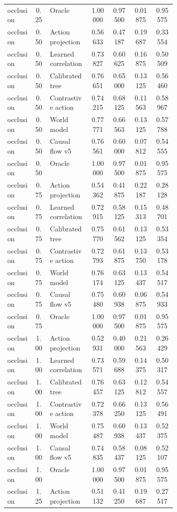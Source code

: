 \documentclass{article}
\begin{document}
\begin{center}
\begin{longtable}{p{0.16\linewidth}cp{0.24\linewidth}cccc}
occlusion & 0.25 & Oracle & 1.00000 & 0.97500 & 0.01875 & 0.95575\\
occlusion & 0.50 & Action projection & 0.56633 & 0.47187 & 0.19687 & 0.33554\\
occlusion & 0.50 & Learned correlation & 0.73827 & 0.60625 & 0.16875 & 0.50509\\
occlusion & 0.50 & Calibrated tree & 0.76651 & 0.65000 & 0.13125 & 0.56460\\
occlusion & 0.50 & Contrastive action & 0.74215 & 0.68125 & 0.11563 & 0.58967\\
occlusion & 0.50 & World model & 0.77771 & 0.66563 & 0.13125 & 0.57788\\
occlusion & 0.50 & Causal flow v5 & 0.76561 & 0.60000 & 0.07812 & 0.54555\\
occlusion & 0.50 & Oracle & 1.00000 & 0.97500 & 0.01875 & 0.95575\\
occlusion & 0.75 & Action projection & 0.54362 & 0.41875 & 0.22187 & 0.28128\\
occlusion & 0.75 & Learned correlation & 0.72915 & 0.58125 & 0.15313 & 0.48701\\
occlusion & 0.75 & Calibrated tree & 0.75770 & 0.61562 & 0.13125 & 0.53354\\
occlusion & 0.75 & Contrastive action & 0.72793 & 0.61875 & 0.13750 & 0.53178\\
occlusion & 0.75 & World model & 0.76174 & 0.63125 & 0.13437 & 0.54517\\
occlusion & 0.75 & Causal flow v5 & 0.75480 & 0.60938 & 0.06875 & 0.54933\\
occlusion & 0.75 & Oracle & 1.00000 & 0.97500 & 0.01875 & 0.95575\\
occlusion & 1.00 & Action projection & 0.52931 & 0.40000 & 0.21563 & 0.26429\\
occlusion & 1.00 & Learned correlation & 0.73571 & 0.59688 & 0.14375 & 0.50317\\
occlusion & 1.00 & Calibrated tree & 0.76457 & 0.63125 & 0.12812 & 0.54557\\
occlusion & 1.00 & Contrastive action & 0.72378 & 0.66250 & 0.13125 & 0.56491\\
occlusion & 1.00 & World model & 0.75487 & 0.60938 & 0.13437 & 0.52375\\
occlusion & 1.00 & Causal flow v5 & 0.74835 & 0.58437 & 0.08125 & 0.52107\\
occlusion & 1.00 & Oracle & 1.00000 & 0.97500 & 0.01875 & 0.95575\\
occlusion & 1.25 & Action projection & 0.51132 & 0.41250 & 0.19687 & 0.27517\\

\end{longtable}
\end{center}
\end{document}
